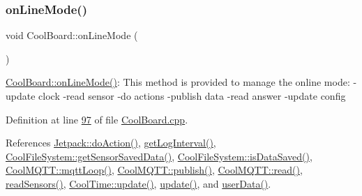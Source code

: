 \mbox{\label{class_cool_board_aa0bbc4bc605e35618d18e68795c61363}} 
\subsubsection{\texorpdfstring{on\+Line\+Mode()}{onLineMode()}}
{\footnotesize\ttfamily void Cool\+Board\+::on\+Line\+Mode (\begin{DoxyParamCaption}{ }\end{DoxyParamCaption})}

\hyperlink{class_cool_board_aa0bbc4bc605e35618d18e68795c61363}{Cool\+Board\+::on\+Line\+Mode()}\+: This method is provided to manage the online mode\+: -\/update clock -\/read sensor -\/do actions -\/publish data -\/read answer -\/update config 

Definition at line \hyperlink{_cool_board_8cpp_source_l00097}{97} of file \hyperlink{_cool_board_8cpp_source}{Cool\+Board.\+cpp}.



References \hyperlink{_jetpack_8cpp_source_l00114}{Jetpack\+::do\+Action()}, \hyperlink{_cool_board_8cpp_source_l00496}{get\+Log\+Interval()}, \hyperlink{_cool_file_system_8cpp_source_l00305}{Cool\+File\+System\+::get\+Sensor\+Saved\+Data()}, \hyperlink{_cool_file_system_8cpp_source_l00292}{Cool\+File\+System\+::is\+Data\+Saved()}, \hyperlink{_cool_m_q_t_t_8cpp_source_l00147}{Cool\+M\+Q\+T\+T\+::mqtt\+Loop()}, \hyperlink{_cool_m_q_t_t_8cpp_source_l00102}{Cool\+M\+Q\+T\+T\+::publish()}, \hyperlink{_cool_m_q_t_t_8cpp_source_l00186}{Cool\+M\+Q\+T\+T\+::read()}, \hyperlink{_cool_board_8cpp_source_l00509}{read\+Sensors()}, \hyperlink{_cool_time_8cpp_source_l00048}{Cool\+Time\+::update()}, \hyperlink{_cool_board_8cpp_source_l00411}{update()}, and \hyperlink{_cool_board_8cpp_source_l00548}{user\+Data()}.


